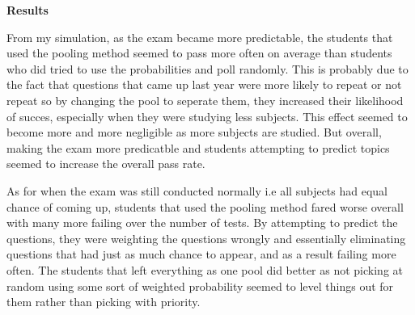 \documentclass[10pt]{article} %
\begin{document}
\textbf{Results}
\begin{figure}[h]
    \centering
    \qquad
    \label{fig:example}
\end{figure}
From my simulation, as the exam became more predictable, the students that used the pooling method seemed to pass more often on average than students who did tried to use the probabilities and poll randomly. This is probably due to the fact that questions that came up last year were more likely to repeat or not repeat so by changing the pool to seperate them, they increased their likelihood of succes, especially when they were studying less subjects. This effect seemed to become more and more negligible as more subjects are studied. But overall, making the exam more predicatble and students attempting to predict topics seemed to increase the overall pass rate.
\begin{figure}[h]
    \centering
    \label{fig:example}
\end{figure}
\newline
\newline
As for when the exam was still conducted normally i.e all subjects had equal chance of coming up, students that used the pooling method fared worse overall with many more failing over the number of tests. By attempting to predict the questions, they were weighting the questions wrongly and essentially eliminating questions that had just as much chance to appear, and as a result failing more often. The students that left everything as one pool did better as not picking at random using some sort of weighted probability seemed to level things out for them rather than picking with priority.
\end{document}
